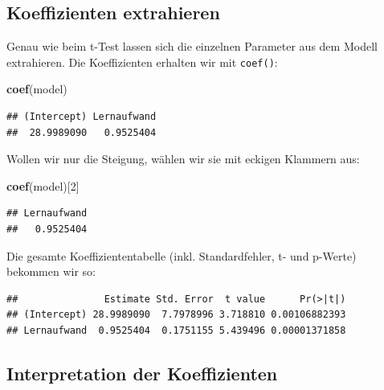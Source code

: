 \documentclass[
]{book}
\newenvironment{Shaded}{\begin{snugshade}}{\end{snugshade}}
\newcommand{\DecValTok}[1]{\textcolor[rgb]{0.00,0.00,0.81}{#1}}
\newcommand{\FunctionTok}[1]{\textcolor[rgb]{0.13,0.29,0.53}{\textbf{#1}}}
\newcommand{\NormalTok}[1]{#1}
\newcommand{\SpecialCharTok}[1]{\textcolor[rgb]{0.81,0.36,0.00}{\textbf{#1}}}
\begin{document}
\subsection{Koeffizienten extrahieren}\label{koeffizienten-extrahieren}

Genau wie beim t-Test lassen sich die einzelnen Parameter aus dem Modell extrahieren. Die Koeffizienten erhalten wir mit \texttt{coef()}:

\begin{Shaded}
\begin{Highlighting}[]
\FunctionTok{coef}\NormalTok{(model)}
\end{Highlighting}
\end{Shaded}

\begin{verbatim}
## (Intercept) Lernaufwand 
##  28.9989090   0.9525404
\end{verbatim}

Wollen wir nur die Steigung, wählen wir sie mit eckigen Klammern aus:

\begin{Shaded}
\begin{Highlighting}[]
\FunctionTok{coef}\NormalTok{(model)[}\DecValTok{2}\NormalTok{]}
\end{Highlighting}
\end{Shaded}

\begin{verbatim}
## Lernaufwand 
##   0.9525404
\end{verbatim}

Die gesamte Koeffiziententabelle (inkl. Standardfehler, t- und p-Werte) bekommen wir so:

\begin{Shaded}
\end{Shaded}

\begin{verbatim}
##               Estimate Std. Error  t value      Pr(>|t|)
## (Intercept) 28.9989090  7.7978996 3.718810 0.00106882393
## Lernaufwand  0.9525404  0.1751155 5.439496 0.00001371858
\end{verbatim}

\subsection{Interpretation der Koeffizienten}\label{interpretation-der-koeffizienten}
\end{document}
